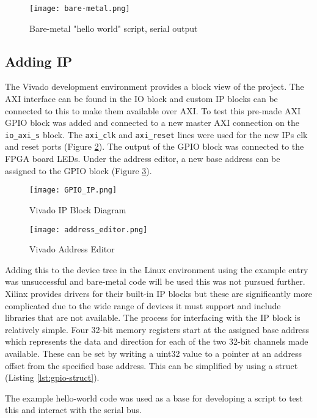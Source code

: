\begin{figure}[H]
	\centering
	\texttt{[image: bare-metal.png]}
	\caption{Bare-metal "hello world" script, serial output}
	\label{fig:helloworld}
\end{figure}

\subsection{Adding IP}
The Vivado development environment provides a block view of the project. The AXI interface can be found in the IO block and custom IP blocks can be connected to this to make them available over AXI. To test this pre-made AXI GPIO block \cite{xilinx_gpio} was added and connected to a new master AXI connection on the \texttt{io\_axi\_s} block. The \texttt{axi\_clk} and \texttt{axi\_reset} lines were used for the new IPs clk and reset ports (Figure \ref{fig:gpio_ip}). The output of the GPIO block was connected to the FPGA board LEDs. Under the address editor, a new base address can be assigned to the GPIO block (Figure \ref{fig:address_editor}).

\begin{figure}[H]
	\centering
	\texttt{[image: GPIO\_IP.png]}
	\caption{Vivado IP Block Diagram}
	\label{fig:gpio_ip}
\end{figure}

\begin{figure}[H]
	\centering
	\texttt{[image: address\_editor.png]}
	\caption{Vivado Address Editor}
	\label{fig:address_editor}
\end{figure}

Adding this to the device tree in the Linux environment using the example entry was unsuccessful and bare-metal code will be used this was not pursued further. Xilinx provides drivers \cite{xilinx_gpio_driver} for their built-in IP blocks but these are significantly more complicated due to the wide range of devices it must support and include libraries that are not available. The process for interfacing with the IP block is relatively simple. Four 32-bit memory registers start at the assigned base address which represents the data and direction for each of the two 32-bit channels made available. These can be set by writing a uint32 value to a pointer at an address offset from the specified base address. This can be simplified by using a struct (Listing \ref{lst:gpio-struct}).

The example hello-world code was used as a base for developing a script to test this and interact with the serial bus.

